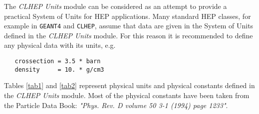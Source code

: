 The {\it CLHEP Units} module can be considered as an attempt to provide
a practical System of Units for HEP applications.
Many standard HEP classes, for example in {\tt GEANT4} and {\tt CLHEP},
assume that data are given in the System of Units defined in the
{\it CLHEP Units} module. For this reason it is recommended to define any
physical data with its units, e.g.
\begin{verbatim}
   crossection = 3.5 * barn
   density     = 10. * g/cm3
\end{verbatim}

Tables \ref{tab1} and \ref{tab2} represent physical units and
physical constants defined in the {\it CLHEP Units} module.
Most of the physical constants have been taken from
the Particle Data Book: {\it "Phys. Rev. D volume 50 3-1 (1994) page 1233"}.

